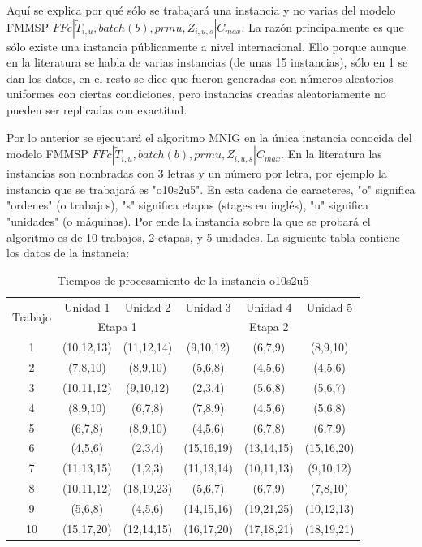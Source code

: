 \documentclass{article}
\def\notac_modelo{$FFc | \tilde{T}_{i, u}, batch(b), prmu, Z_{i, u, s} | C_{max}$}
\begin{document}
Aquí se explica por qué sólo se trabajará una instancia y no varias del modelo FMMSP \notac_modelo. La razón principalmente es que sólo existe una instancia públicamente a nivel internacional. Ello porque aunque en la literatura se habla de varias instancias (de unas 15 instancias), sólo en 1 se dan los datos, en el resto se dice que fueron generadas con números aleatorios uniformes con ciertas condiciones, pero instancias creadas aleatoriamente no pueden ser replicadas con exactitud. \autocite{modFMMSP}

\vspace{\baselineskip}
Por lo anterior se ejecutará el algoritmo MNIG en la única instancia conocida del modelo FMMSP \notac_modelo. En la literatura las instancias son nombradas con 3 letras y un número por letra, por ejemplo la instancia que se trabajará es "o10s2u5". En esta cadena de caracteres, "o" significa "ordenes" (o trabajos), "s" significa etapas (stages en inglés), "u" significa "unidades" (o máquinas). Por ende la instancia sobre la que se probará el algoritmo es de 10 trabajos, 2 etapas, y 5 unidades. La siguiente tabla contiene los datos de la instancia: \autocite{modFMMSP}

\begin{table}[h]
    \caption{Tiempos de procesamiento de la instancia o10s2u5}
    \label{tab:tProc}
    \begin{center}
    \begin{tabular}{c|c|c|c|c|c}
        \hline
        \multirow{2}{*}{Trabajo} & Unidad 1 & Unidad 2 & Unidad 3 & Unidad 4 & Unidad 5\\
        \cline{2-6}
        & \multicolumn{2}{c|}{Etapa 1} & \multicolumn{3}{c}{Etapa 2}\\
        \hline
        1 & (10,12,13) & (11,12,14) & (9,10,12) & (6,7,9) & (8,9,10)\\
        2 & (7,8,10) & (8,9,10) & (5,6,8) & (4,5,6) & (4,5,6) \\
        3 & (10,11,12) & (9,10,12) & (2,3,4) & (5,6,8) & (5,6,7) \\
        4 & (8,9,10) & (6,7,8) & (7,8,9) & (4,5,6) & (5,6,8) \\
        5 & (6,7,8) & (8,9,10) & (4,5,6) & (6,7,8) & (6,7,9) \\
        6 & (4,5,6) & (2,3,4) & (15,16,19) & (13,14,15) & (15,16,20) \\
        7 & (11,13,15) & (1,2,3) & (11,13,14) & (10,11,13) & (9,10,12) \\
        8 & (10,11,12) & (18,19,23) & (5,6,7) & (6,7,9) & (7,8,10) \\
        9 & (5,6,8) & (4,5,6) & (14,15,16) & (19,21,25) & (10,12,13) \\
        10 & (15,17,20) & (12,14,15) & (16,17,20) & (17,18,21) & (18,19,21) \\
        \hline
    \end{tabular}
    \end{center}
\end{table}
\end{document}
